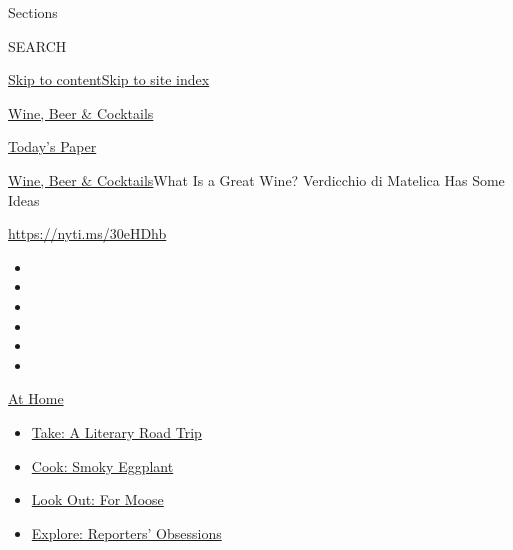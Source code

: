 Sections

SEARCH

\protect\hyperlink{site-content}{Skip to
content}\protect\hyperlink{site-index}{Skip to site index}

\href{https://www.nytimes.com/section/food/drinks}{Wine, Beer \&
Cocktails}

\href{https://myaccount.nytimes.com/auth/login?response_type=cookie\&client_id=vi}{}

\href{https://www.nytimes.com/section/todayspaper}{Today's Paper}

\href{/section/food/drinks}{Wine, Beer \& Cocktails}\textbar{}What Is a
Great Wine? Verdicchio di Matelica Has Some Ideas

\url{https://nyti.ms/30eHDhb}

\begin{itemize}
\item
\item
\item
\item
\item
\item
\end{itemize}

\href{https://www.nytimes.com/spotlight/at-home?action=click\&pgtype=Article\&state=default\&region=TOP_BANNER\&context=at_home_menu}{At
Home}

\begin{itemize}
\tightlist
\item
  \href{https://www.nytimes.com/2020/07/28/books/time-for-a-literary-road-trip.html?action=click\&pgtype=Article\&state=default\&region=TOP_BANNER\&context=at_home_menu}{Take:
  A Literary Road Trip}
\item
  \href{https://www.nytimes.com/2020/07/29/magazine/bored-with-your-home-cooking-some-smoky-eggplant-will-fix-that.html?action=click\&pgtype=Article\&state=default\&region=TOP_BANNER\&context=at_home_menu}{Cook:
  Smoky Eggplant}
\item
  \href{https://www.nytimes.com/2020/07/27/travel/moose-michigan-isle-royale.html?action=click\&pgtype=Article\&state=default\&region=TOP_BANNER\&context=at_home_menu}{Look
  Out: For Moose}
\item
  \href{https://www.nytimes.com/interactive/2020/at-home/even-more-reporters-editors-diaries-lists-recommendations.html?action=click\&pgtype=Article\&state=default\&region=TOP_BANNER\&context=at_home_menu}{Explore:
  Reporters' Obsessions}
\end{itemize}

